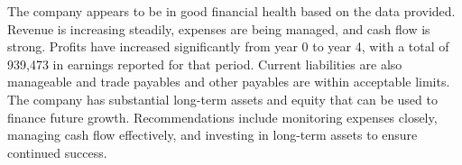 

The company appears to be in good financial health based on the data provided. Revenue is increasing steadily, expenses are being managed, and cash flow is strong. Profits have increased significantly from year 0 to year 4, with a total of 939,473 in earnings reported for that period. Current liabilities are also manageable and trade payables and other payables are within acceptable limits. The company has substantial long-term assets and equity that can be used to finance future growth. Recommendations include monitoring expenses closely, managing cash flow effectively, and investing in long-term assets to ensure continued success.